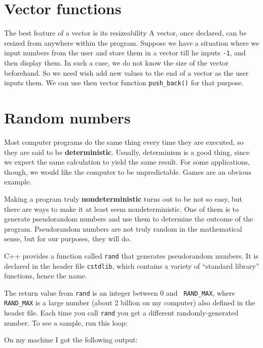 \section{Vector functions}

The best feature of a vector is its resizeability A vector, once declared,
can be resized from anywhere within the program. Suppose we have a situation
where we input numbers from the user and store them in a vector till he
inputs {\tt -1}, and then display them. In such a case, we do not know the size of the
vector beforehand. So we need wish add new values to the end of
a vector as the user inputs them. We can use then vector
function {\tt push\_back()} for that purpose.



\section{Random numbers}
\label{random}
\label{pseudorandom}

Most computer programs do the same thing every time they are executed,
so they are said to be {\bf deterministic}.  Usually, determinism is a
good thing, since we expect the same calculation to yield the same
result.  For some applications, though, we would like the
computer to be unpredictable.  Games are an obvious example.

Making a program truly {\bf nondeterministic} turns out to be not
so easy, but there are ways to make it at least seem
nondeterministic.  One of them is to generate {pseudorandom} numbers and
use them to determine the outcome of the program.
Pseudorandom numbers
are not truly random in the mathematical sense, but 
for our purposes, they will do.

C++ provides a function called {\tt rand} that generates
pseudorandom numbers.  It is declared in the
header file {\tt cstdlib}, which contains a variety of ``standard
library'' functions, hence the name.

The return value from {\tt rand} is an integer between 0 and {\tt
RAND\_MAX}, where {\tt RAND\_MAX} is a large number (about 2 billion
on my computer) also defined in the header file.  Each time you call
{\tt rand} you get a different randomly-generated number.  To see a
sample, run this loop:


%
On my machine I got the following output:

